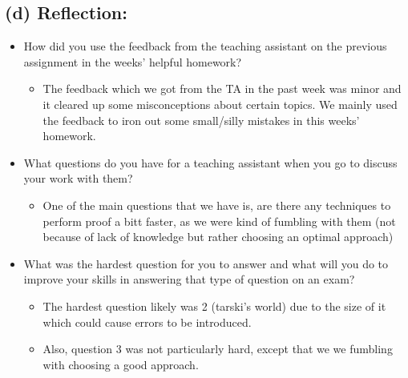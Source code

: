 \documentclass[a4paper]{article}
\begin{document}
\subsection{(d) \textbf{Reflection:}}
\begin{itemize}
    \item How did you use the feedback from the teaching assistant on the previous assignment in the weeks' helpful homework?
    \begin{itemize}
        \item The feedback which we got from the TA in the past week was minor and it cleared up some misconceptions about certain topics. We mainly used the feedback to iron out some small/silly mistakes in this weeks' homework.
    \end{itemize}
    \item What questions do you have for a teaching assistant when you go to discuss your work with them?
    \begin{itemize}
        \item One of the main questions that we have is, are there any techniques to perform proof a bitt faster, as we were kind of fumbling with them (not because of lack of knowledge but rather choosing an optimal approach) 
    \end{itemize}
    \item What was the hardest question for you to answer and what will you do to improve your skills in answering that type of question on an exam?
    \begin{itemize}
        \item The hardest question likely was 2 (tarski's world) due to the size of it which could cause errors to be introduced.
        \item Also, question 3 was not particularly hard, except that we we fumbling with choosing a good approach.
    \end{itemize}
\end{itemize}
\end{document}
